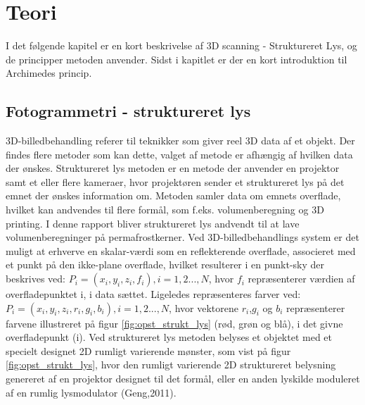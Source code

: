 \chapter{Teori}
I det følgende kapitel er en kort beskrivelse af 3D scanning - Struktureret Lys, og de principper metoden anvender. Sidst i kapitlet er der en kort introduktion til  Archimedes princip. 

\section{Fotogrammetri - struktureret lys}
3D-billedbehandling referer til teknikker som giver reel 3D data af et objekt. Der findes flere metoder som kan dette, valget af metode er afhængig af hvilken data der ønskes. Struktureret lys metoden er en metode der anvender en projektor samt et eller flere kameraer, hvor projektøren sender et struktureret lys på det emnet der ønskes information om. Metoden samler data om emnets overflade, hvilket kan andvendes til flere formål, som f.eks. volumenberegning og 3D printing. I denne rapport bliver struktureret lys andvendt til at lave volumenberegninger på permafrostkerner.
Ved 3D-billedbehandlings system er det muligt at erhverve en skalar-værdi som en reflekterende overflade, associeret med et punkt på den ikke-plane overflade, hvilket resulterer i en punkt-sky der beskrives ved: $P_i=(x_i,y_i,z_i,f_i),i=1,2...,N$, hvor $f_i$ repræsenterer værdien af overfladepunktet i, i data sættet. Ligeledes repræsenteres farver ved: $P_i=(x_i,y_i,z_i,r_i,g_i,b_i),i=1,2...,N$, hvor vektorene $r_i$,$g_i$ og $b_i$ repræsenterer farvene illustreret på figur \vref{fig:opst_strukt_lys} (rød, grøn og blå), i det givne overfladepunkt (i). 
Ved struktureret lys metoden belyses et objektet med et specielt designet 2D rumligt varierende mønster, som vist på figur \vref{fig:opst_strukt_lys}, hvor den rumligt varierende 2D struktureret belysning genereret af en projektor designet til det formål, eller en anden lyskilde moduleret af en rumlig lysmodulator (Geng,2011).

